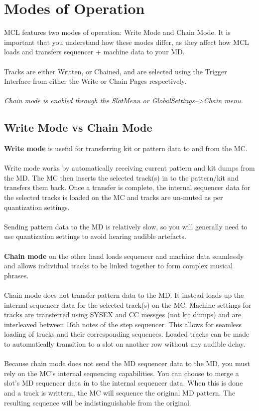 \chapter{Modes of Operation}
MCL features two modes of operation: Write Mode and Chain Mode. It is important that you understand how these modes differ, as they affect how MCL loads and transfers sequencer + machine data to your MD.\\
\\
Tracks are either Written, or Chained, and are selected using the Trigger Interface from either the Write or Chain Pages respectively. \\
\\
\textit{Chain mode is enabled through the SlotMenu or GlobalSettings-->Chain menu.}
\section{Write Mode vs Chain Mode}
\textbf{Write mode} is useful for transferring kit or pattern data to and from the MC. \\
\\
Write mode works by automatically receiving current pattern and kit dumps from the MD. The MC then inserts the selected track(s) in to the pattern/kit and transfers them back. Once a transfer is complete, the internal sequencer data for the selected tracks is loaded on the MC and tracks are un-muted as per quantization settings.\\
\\
Sending pattern data to the MD is relatively slow, so you will generally need to use quantization settings to avoid hearing audible artefacts.\\
\\
\textbf{Chain mode}  on the other hand loads sequencer and machine data seamlessly and allows individual tracks to be linked together to form complex musical phrases. \\
\\
Chain mode does not transfer pattern data to the MD. It instead  loads up the internal sequencer data for the selected track(s) on the MC. Machine settings for tracks are transferred using SYSEX and CC messges (not kit dumps) and are interleaved between 16th notes of the step sequencer. This allows for seamless loading of tracks and their corresponding sequences. Loaded tracks can be made to automatically transition to a slot on another row without any audible delay. \\
\\
Because chain mode does not send the MD sequencer data to the MD, you must rely on the MC's internal sequencing capabilities. You can choose to merge a slot's MD sequencer data in to the internal sequencer data. When this is done and a track is writtern, the MC will sequence the original MD pattern. The resulting sequence will be indistinguishable from the original.

